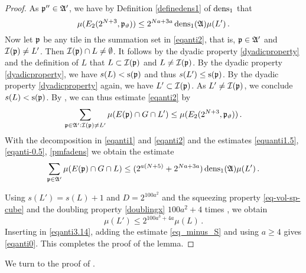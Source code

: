 \begin{proof}
As ${\mathfrak p}''\in \mathfrak{A}'$, we have by Definition
\eqref{definedens1} of $\operatorname{\operatorname{dens}}_1$ that
\begin{equation}\label{pmfadens}
   \mu(E_2(2^{N+3}, {\mathfrak p}_{{\vartheta}}))\le 2^{Na+3a}\operatorname{\operatorname{dens}}_1(\mathfrak{A}) {\mu(L')}\, .
\end{equation}
Now let ${\mathfrak p}$ be any tile in the summation set in \eqref{eqanti2}, that is, ${\mathfrak p}\in \mathfrak{A}'$ and ${\mathcal{I}}({\mathfrak p})\neq L'$.
Then ${\mathcal{I}}({\mathfrak p})\cap L\neq \emptyset$. It follows by the dyadic property \eqref{dyadicproperty}
and the definition of $L$ that
$L\subset {\mathcal{I}}({\mathfrak p})$ and $L\neq {\mathcal{I}}({\mathfrak p})$. By the dyadic property \eqref{dyadicproperty}, we have
$s(L)<{\mathrm{s}}({\mathfrak p})$ and thus $s(L')\le {\mathrm{s}}({\mathfrak p})$. By the dyadic property
   \eqref{dyadicproperty} again, we have $L'\subset {\mathcal{I}}({\mathfrak p})$.
As $L'\neq {\mathcal{I}}({\mathfrak p})$, we conclude $s(L)<{\mathrm{s}}({\mathfrak p})$.
By , we can thus estimate \eqref{eqanti2} by
\begin{equation}\label{eqanti0.5}
    \sum_{{\mathfrak p}\in\mathfrak{A}':{\mathcal{I}}({\mathfrak p})\neq L'}\mu(E({\mathfrak p})\cap G\cap L')
    \le \mu (E_2(2^{N+3},{\mathfrak p}_{{\vartheta}}))\, .
\end{equation}
With the decomposition in \eqref{eqanti1} and \eqref{eqanti2} and the
estimates \eqref{equanti1.5}, \eqref{eqanti-0.5}, \eqref{pmfadens} we obtain
the estimate
\begin{equation}\label{eqanti3.14}
\sum_{{\mathfrak p}\in\mathfrak{A}'}\mu(E({\mathfrak p})\cap G \cap L)
    \le (2^{a(N+5)}+2^{Na+3a})\operatorname{\operatorname{dens}}_1(\mathfrak{A})\mu(L')\,.
\end{equation}

Using $s(L')=s(L)+1$ and $D=2^{100a^2}$ and the
squeezing property \eqref{eq-vol-sp-cube}
and the doubling property \eqref{doublingx} $100a^2+4$ times , we obtain
\begin{equation}
    \mu(L')\le 2^{100a^3+4a}\mu(L)\, .
\end{equation}
Inserting in \eqref{eqanti3.14}, adding the estimate \eqref{eq_minus_S} and using $a\ge 4$ gives \eqref{eqanti0}.
This completes the proof of the lemma.
\end{proof}



We turn to the proof of .


